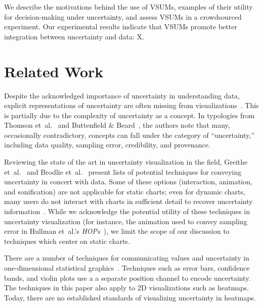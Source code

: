 \documentclass{vgtc}                          %
\newcommand{\ea}{{et~al.}\xspace}
\begin{document}
We describe the motivations behind the use of VSUMs, examples of their utility for decision-making under uncertainty, and assess VSUMs in a crowdsourced experiment. Our experimental results indicate that VSUMs promote better integration between uncertainty and data: X.

\exampleFig
\section{Related Work}


Despite the acknowledged importance of uncertainty in understanding data, explicit representations of uncertainty are often missing from visualizations~\cite{boukhelifa2009uncertainty}. This is partially due to the complexity of uncertainty as a concept. In typologies from Thomson \ea~\cite{thomson2005typology} and Buttenfield \& Beard~\cite{buttenfield1994graphical}, the authors note that many, occasionally contradictory, concepts can fall under the category of ``uncertainty,'' including data quality, sampling error, credibility, and provenance.

Reviewing the state of the art in uncertainty visualization in the field, Greithe \ea~\cite{griethe2006visualization} and Brodlie \ea~\cite{brodlie2012review} present lists of potential techniques for conveying uncertainty in concert with data. Some of these options (interaction, animation, and sonification) are not applicable for static charts; even for dynamic charts, many users do not interact with charts in sufficient detail to recover uncertainty information~\cite{nyt2016}. While we acknowledge the potential utility of these techniques in uncertainty visualization (for instance, the animation used to convey sampling error in Hullman \ea's \emph{HOPs}~\cite{hullman2015hypothetical}), we limit the scope of our discussion to techniques which center on static charts.

There are a number of techniques for communicating values and uncertainty in one-dimensional statistical graphics~\cite{olston2002visualizing, wickham201140, neyman1937outline}. Techniques such as error bars, confidence bands, and violin plots use a a separate position channel to encode uncertainty. The techniques in this paper also apply to 2D visualizations such as heatmaps. Today, there are no established standards of visualizing uncertainty in heatmaps.
\end{document}
